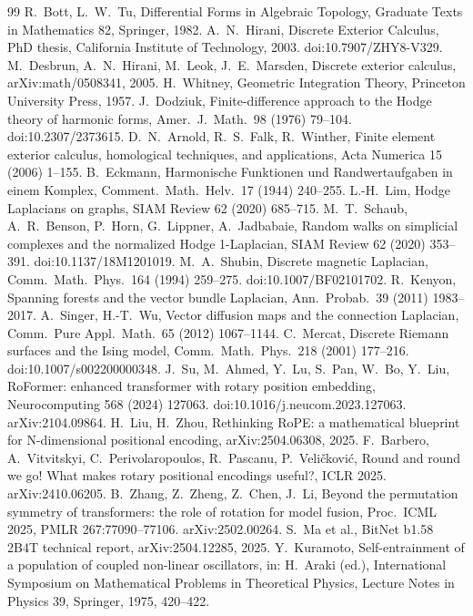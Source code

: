 \documentclass[10pt]{article}
\theoremstyle{definition}
\begin{document}
\begin{thebibliography}{99}
 R.~Bott, L.~W.~Tu, Differential Forms in Algebraic Topology, Graduate Texts in Mathematics 82, Springer, 1982.
 A.~N.~Hirani, Discrete Exterior Calculus, PhD thesis, California Institute of Technology, 2003. doi:10.7907/ZHY8-V329.
 M.~Desbrun, A.~N.~Hirani, M.~Leok, J.~E.~Marsden, Discrete exterior calculus, arXiv:math/0508341, 2005.
 H.~Whitney, Geometric Integration Theory, Princeton University Press, 1957.
 J.~Dodziuk, Finite-difference approach to the Hodge theory of harmonic forms, Amer.\ J.\ Math.\ 98 (1976) 79--104. doi:10.2307/2373615.
 D.~N.~Arnold, R.~S.~Falk, R.~Winther, Finite element exterior calculus, homological techniques, and applications, Acta Numerica 15 (2006) 1--155.
 B.~Eckmann, Harmonische Funktionen und Randwertaufgaben in einem Komplex, Comment.\ Math.\ Helv.\ 17 (1944) 240--255.
 L.-H.~Lim, Hodge Laplacians on graphs, SIAM Review 62 (2020) 685--715.
 M.~T.~Schaub, A.~R.~Benson, P.~Horn, G.~Lippner, A.~Jadbabaie, Random walks on simplicial complexes and the normalized Hodge 1-Laplacian, SIAM Review 62 (2020) 353--391. doi:10.1137/18M1201019.
 M.~A.~Shubin, Discrete magnetic Laplacian, Comm.\ Math.\ Phys.\ 164 (1994) 259--275. doi:10.1007/BF02101702.
 R.~Kenyon, Spanning forests and the vector bundle Laplacian, Ann.\ Probab.\ 39 (2011) 1983--2017.
 A.~Singer, H.-T.~Wu, Vector diffusion maps and the connection Laplacian, Comm.\ Pure Appl.\ Math.\ 65 (2012) 1067--1144.
 C.~Mercat, Discrete Riemann surfaces and the Ising model, Comm.\ Math.\ Phys.\ 218 (2001) 177--216. doi:10.1007/s002200000348.
 J.~Su, M.~Ahmed, Y.~Lu, S.~Pan, W.~Bo, Y.~Liu, RoFormer: enhanced transformer with rotary position embedding, Neurocomputing 568 (2024) 127063. doi:10.1016/j.neucom.2023.127063. arXiv:2104.09864.
 H.~Liu, H.~Zhou, Rethinking RoPE: a mathematical blueprint for N-dimensional positional encoding, arXiv:2504.06308, 2025.
 F.~Barbero, A.~Vitvitskyi, C.~Perivolaropoulos, R.~Pascanu, P.~Veli\v{c}kovi\'c, Round and round we go! What makes rotary positional encodings useful?, ICLR 2025. arXiv:2410.06205.
 B.~Zhang, Z.~Zheng, Z.~Chen, J.~Li, Beyond the permutation symmetry of transformers: the role of rotation for model fusion, Proc.\ ICML 2025, PMLR 267:77090--77106. arXiv:2502.00264.
 S.~Ma et al., BitNet b1.58 2B4T technical report, arXiv:2504.12285, 2025.
 Y.~Kuramoto, Self-entrainment of a population of coupled non-linear oscillators, in: H.~Araki (ed.), International Symposium on Mathematical Problems in Theoretical Physics, Lecture Notes in Physics 39, Springer, 1975, 420--422.

\end{thebibliography}
\end{document}
